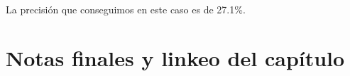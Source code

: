 La precisi\'on que conseguimos en este caso es de 27.1\%.


\section{Notas finales y linkeo del cap\'itulo}
\label{sec-final}

